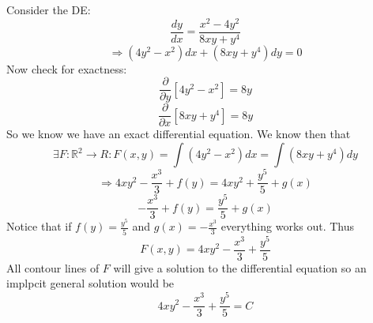 \documentclass[12pt]{article}
\begin{document}
\noindent 
Consider the DE: 
\[ 
    \frac{dy}{dx} = \frac{x^2 - 4y^2}{8xy + y^4}
\]
\[ 
    \Rightarrow (4y^2 - x^2)dx + (8xy + y^4)dy = 0
\]
Now check for exactness: 
\[ 
    \frac{\partial }{\partial y}\left[ 4y^2 - x ^2\right] = 8y 
\]
\[ 
    \frac{\partial}{\partial x}\left[ 8xy + y^4\right] = 8y
\]
So we know we have an exact differential equation.
We know then that  
\[
    \exists F:\mathbb R^2 \to R : F(x,y) = \displaystyle\int (4y^2 - x^2)dx = 
    \displaystyle\int (8xy+y^4)dy
\]
\[ 
    \Rightarrow 4xy^2 - \frac{x^3}{3} + f(y) = 4xy^2 + \frac{y^5}{5}+g(x)
\]
\[ 
    -\frac{x^3}{3} + f(y) = \frac{y^5}{5} + g(x)
\]
Notice that if \(f(y) = \frac{y^5}{5}\) and \(g(x) = -\frac{x^3}{3}\) everything works out. 
Thus 
\[
    F(x,y) = 4xy^2 - \frac{x^3}{3} + \frac{y^5}{5}
\]
All contour lines of \(F\) will give a solution to the differential equation so 
an implpcit general solution would be 
\[ 
    4xy^2 - \frac{x^3}{3}+\frac{y^5}{5} = C
\]
\end{document}
